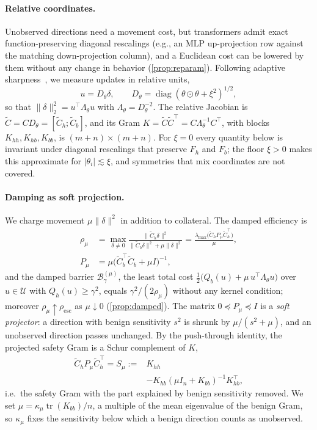 \documentclass[11pt]{article}
\newcommand{\Resc}{\rho_{\mathrm{esc}}}
\newcommand{\Barrier}{\mathcal{B}}
\newcommand{\U}{\mathcal{U}}
\newcommand{\rhoreg}{\rho_{\mu}}
\newcommand{\Lam}{\Lambda_{\theta}}
\newcommand{\diag}{\operatorname{diag}}
\newcommand{\tr}{\operatorname{tr}}
\newcommand{\Cth}{\widetilde{C}_{h}}
\newcommand{\Ctb}{\widetilde{C}_{b}}
\newcommand{\Pmu}{P_{\mu}}
\newcommand{\Smu}{S_{\mu}}
\begin{document}
\paragraph{Relative coordinates.}
Unobserved directions need a movement cost, but transformers admit exact function-preserving diagonal rescalings (e.g., an MLP up-projection row against the matching down-projection column), and a Euclidean cost can be lowered by them without any change in behavior (\cref{prop:reparam}). Following adaptive sharpness~\citep{kwon2021asam}, we measure updates in relative units,
\begin{equation}
u=D_\theta\delta,\qquad D_\theta=\diag(\theta\odot\theta+\xi^2)^{1/2},
\label{eq:relative}
\end{equation}
so that $\|\delta\|_2^2=u^\top\Lam u$ with $\Lam=D_\theta^{-2}$. The relative Jacobian is $\widetilde C=CD_\theta=[\Cth;\Ctb]$, and its Gram $K=\widetilde C\widetilde C^\top=C\Lam^{-1}C^\top$, with blocks $K_{hh},K_{hb},K_{bb}$, is $(m+n)\times(m+n)$. For $\xi=0$ every quantity below is invariant under diagonal rescalings that preserve $F_h$ and $F_b$; the floor $\xi>0$ makes this approximate for $|\theta_i|\lesssim\xi$, and symmetries that mix coordinates are not covered.

\paragraph{Damping as soft projection.}
We charge movement $\mu\|\delta\|^2$ in addition to collateral. The damped efficiency is
\begin{equation}
\begin{aligned}
\rhoreg&=\max_{\delta\ne0}\frac{\|\Cth\delta\|^2}{\|\Ctb\delta\|^2+\mu\|\delta\|^2}
=\frac{\lambda_{\max}\bigl(\Cth\Pmu\Cth^{\top}\bigr)}{\mu},\\
\Pmu&=\mu\bigl(\Ctb^{\top}\Ctb+\mu I\bigr)^{-1},
\end{aligned}
\label{eq:damped}
\end{equation}
and the damped barrier $\Barrier^{(\mu)}_\gamma$, the least total cost $\tfrac12\bigl(Q_b(u)+\mu\,u^\top\Lam u\bigr)$ over $u\in\U$ with $Q_h(u)\ge\gamma^2$, equals $\gamma^2/(2\rhoreg)$ without any kernel condition; moreover $\rhoreg\uparrow\Resc$ as $\mu\downarrow0$ (\cref{prop:damped}). The matrix $0\preceq\Pmu\preceq I$ is a \emph{soft projector}: a direction with benign sensitivity $s^2$ is shrunk by $\mu/(s^2+\mu)$, and an unobserved direction passes unchanged. By the push-through identity, the projected safety Gram is a Schur complement of $K$,
\begin{equation}
\begin{aligned}
\Cth\Pmu\Cth^{\top}=\Smu:={}&K_{hh}\\
&-K_{hb}(\mu I_n+K_{bb})^{-1}K_{hb}^\top ,
\end{aligned}
\label{eq:reduced}
\end{equation}
i.e.\ the safety Gram with the part explained by benign sensitivity removed. We set $\mu=\kappa_\mu\tr(K_{bb})/n$, a multiple of the mean eigenvalue of the benign Gram, so $\kappa_\mu$ fixes the sensitivity below which a benign direction counts as unobserved.
\end{document}
